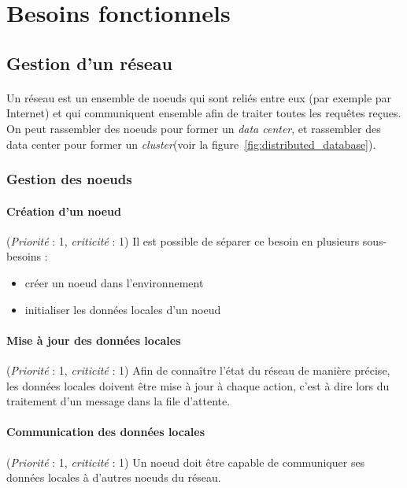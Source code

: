 \documentclass[12pt]{article}
\newcommand{\besoin}[2] {
  (\textit{Priorité} : #1, \textit{criticité} : #2)
}
\begin{document}
\newpage

\section{Besoins fonctionnels}

\subsection{Gestion d'un réseau}

\paragraph{} Un réseau est un ensemble de noeuds qui sont reliés entre eux (par exemple par Internet) et qui communiquent ensemble afin de traiter toutes les requêtes reçues. On peut rassembler des noeuds pour former un \textit{data center}, et rassembler des data center pour former un \textit{cluster}(voir la figure~\ref{fig:distributed_database}).


\subsubsection{Gestion des noeuds}

\paragraph{Création d'un noeud} \besoin{1}{1} Il est possible de séparer ce besoin en plusieurs sous-besoins :
 \begin{itemize}
 	\item créer un noeud dans l'environnement
 	\item initialiser les données locales d'un noeud
 \end{itemize}

\paragraph{Mise à jour des données locales} \besoin{1}{1} Afin de connaître l'état du réseau de manière précise, les données locales doivent être mise à jour à chaque action,
c'est à dire lors du traitement d'un message dans la file d'attente.


\paragraph{Communication des données locales} \besoin{1}{1} Un noeud doit être capable de communiquer ses données locales à d'autres noeuds du réseau.
\end{document}
